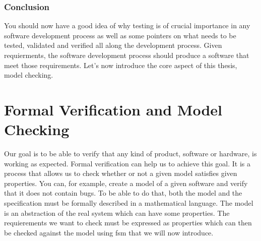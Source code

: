 \documentclass[12pt]{article}
\theoremstyle{definition}
\theoremstyle{definition}
\theoremstyle{remark}
\begin{document}

\section{Conclusion}


You should now have a good idea of why testing is of crucial importance in any software development process as well as some pointers on what needs to be tested, validated and verified all along the development process. Given requierments, the software development process should produce a software that meet those requirements. Let's now introduce the core aspect of this thesis, model checking.



\clearpage
\part{Formal Verification and Model Checking}\label{ModelChecking}

Our goal is to be able to verify that any kind of product, software or hardware, is working as expected. Formal verification can help us to achieve this goal. It is a process that allows us to check whether or not a given model satisfies given properties. You can, for example, create a model of a given software and verify that it does not contain bugs. To be able to do that, both the model and the specification must be formally described in a mathematical language. The model is an abstraction of the real system which can have some properties. The requierements we want to check must be expressed as properties which can then be checked against the model using \gls{fsm} that we will now introduce.\\


\clearpage


\end{document}
